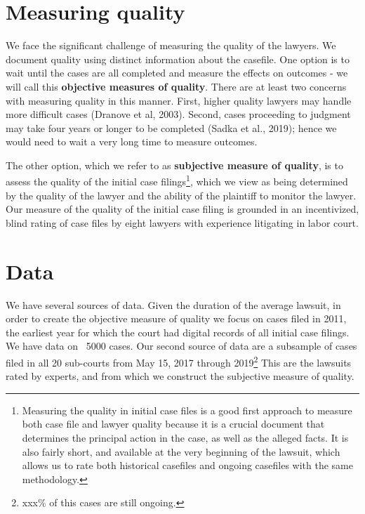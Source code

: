 \documentclass[oneside,11pt]{article}
\begin{document}
\section{Measuring quality}


We face the significant challenge of measuring the quality of the lawyers. We document quality using distinct information about the casefile. One option is to wait until the cases are all completed and measure the effects on outcomes - we will call this \textbf{objective measures of quality}. There are at least two concerns with measuring quality in this manner. First, higher quality lawyers may handle more difficult cases (Dranove et al, 2003). Second, cases proceeding to judgment may take four years or longer to be completed (Sadka et al., 2019); hence we would need to wait a very long time to measure outcomes.  


The other option, which we refer to as \textbf{subjective measure of quality}, is to assess the quality of the initial case filings\footnote{Measuring the quality in initial case files is a good first approach to measure both case file and lawyer quality because it is a crucial document that determines the principal action in the case, as well as the alleged facts. It is also fairly short, and available at the very beginning of the lawsuit, which allows us to rate both historical casefiles and ongoing casefiles with the same methodology.}, which we view as being determined by the quality of the lawyer and the ability of the plaintiff to monitor the lawyer. Our measure of the quality of the initial case filing is grounded in an incentivized, blind rating of case files by eight lawyers with experience litigating in labor court.


\section{Data}

We have several sources of data. Given the duration of the average lawsuit, in order to create the objective measure of quality we focus on cases filed in 2011, the earliest year for which the court had digital records of all initial case filings. We have data on ~5000 cases. Our second source of data are a subsample of cases filed in all 20 sub-courts from May 15, 2017 through 2019\footnote{xxx\% of this cases are still ongoing.} This are the lawsuits rated by experts, and from which we construct the subjective measure of quality.
\end{document}
